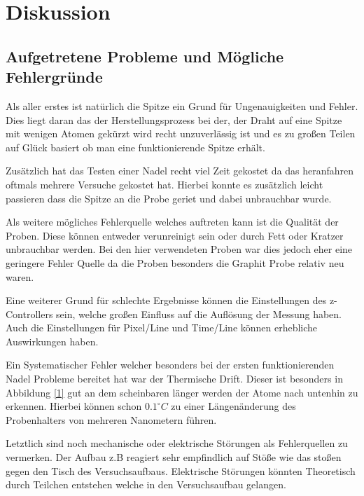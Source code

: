 \FloatBarrier
\newpage
\section{Diskussion}
\subsection{Aufgetretene Probleme und Mögliche Fehlergründe}
Als aller erstes ist natürlich die Spitze ein Grund für Ungenauigkeiten und Fehler. Dies liegt daran das der Herstellungsprozess bei der, der Draht auf eine Spitze mit wenigen Atomen gekürzt wird recht unzuverlässig ist und es zu großen Teilen auf Glück basiert ob man eine funktionierende Spitze erhält. \par
Zusätzlich hat das Testen einer Nadel recht viel Zeit gekostet da das heranfahren oftmals mehrere Versuche gekostet hat. Hierbei konnte es zusätzlich leicht passieren dass die Spitze an die Probe geriet und dabei unbrauchbar wurde.\par
Als weitere mögliches Fehlerquelle welches auftreten kann ist die Qualität der Proben. Diese können entweder verunreinigt sein oder durch Fett oder Kratzer unbrauchbar werden. Bei den hier verwendeten Proben war dies jedoch eher eine geringere Fehler Quelle da die Proben besonders die Graphit Probe relativ neu waren.\par
Eine weiterer Grund für schlechte Ergebnisse können die Einstellungen des z-Controllers sein, welche großen Einfluss auf die Auflösung der Messung haben. Auch die Einstellungen für Pixel/Line und Time/Line können erhebliche Auswirkungen haben. \par
Ein Systematischer Fehler welcher besonders bei der ersten funktionierenden Nadel Probleme bereitet hat war der Thermische Drift. Dieser ist besonders in Abbildung \ref{1} gut an dem scheinbaren länger werden der Atome nach untenhin zu erkennen. Hierbei können schon $0.1^\circ C$ zu einer Längenänderung des Probenhalters von mehreren Nanometern führen\cite{RMT}.\par
Letztlich sind noch mechanische oder elektrische Störungen als Fehlerquellen zu vermerken. Der Aufbau z.B reagiert sehr empfindlich auf Stöße wie das stoßen gegen den Tisch des Versuchsaufbaus. Elektrische Störungen könnten Theoretisch durch Teilchen entstehen welche in den Versuchsaufbau gelangen. 
